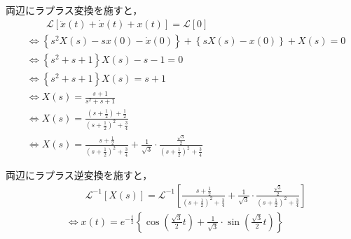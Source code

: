 \documentclass[a4paper,12pt]{article}
\begin{document}
\newpage
\begin{tcolorbox}[title={7.初期値を\( \dot{x}(0)=0,x(0)=1\)とするとき、微分方程式\(\ddot{x}(t)+\dot{x}(t)+x(t)=0\)を解け。 
    }]
    \quad 両辺にラプラス変換を施すと，
    \vspace{-3mm}
    \begin{align*}
        &\qquad \mathcal{L}\left[ \ddot{x}(t)+\dot{x}(t)+x(t) \right] 
        = \mathcal{L} \left[ 0 \right] \\
        &\Leftrightarrow \left\{ s^2 X(s) - sx(0) - \dot{x}(0) \right\}
        + \left\{ sX(s) - x(0) \right\}
        + X(s) = 0  \\
        &\Leftrightarrow \left\{ s^2 + s + 1 \right\} X(s) - s - 1= 0  \\
        &\Leftrightarrow \left\{ s^2 + s + 1 \right\} X(s) = s + 1 \\
        &\Leftrightarrow X(s) = \frac{s+1}{s^2 + s + 1} \\
        &\Leftrightarrow X(s) = \frac{(s+\frac{1}{2})+\frac{1}{2}}{(s+\frac{1}{2})^2+\frac{3}{4}} \\
        &\Leftrightarrow X(s) = \frac{s+\frac{1}{2}}{(s+\frac{1}{2})^2+\frac{3}{4}} 
        +\frac{1}{\sqrt{3}} \cdot \frac{\frac{\sqrt{3}}{2}}{(s+\frac{1}{2})^2+\frac{3}{4}} 
    \end{align*}
        
    \quad 両辺にラプラス逆変換を施すと，
    \vspace{-3mm}
    \begin{align*}
    &\qquad \mathcal{L}^{-1} \left[ X(s) \right] 
    = \mathcal{L}^{-1} \left[\frac{s+\frac{1}{2}}{(s+\frac{1}{2})^2+\frac{3}{4}} 
    +\frac{1}{\sqrt{3}} \cdot \frac{\frac{\sqrt{3}}{2}}{(s+\frac{1}{2})^2+\frac{3}{4}}  \right] \\
    &\Leftrightarrow x(t) =e^{-\frac{t}{2}}\left\{\cos \left(\frac{\sqrt{3}}{2}t \right)+\frac{1}{\sqrt{3}} \cdot \sin \left( \frac{\sqrt{3}}{2}t \right) \right\}
    \end{align*}
\end{tcolorbox}
\end{document}
